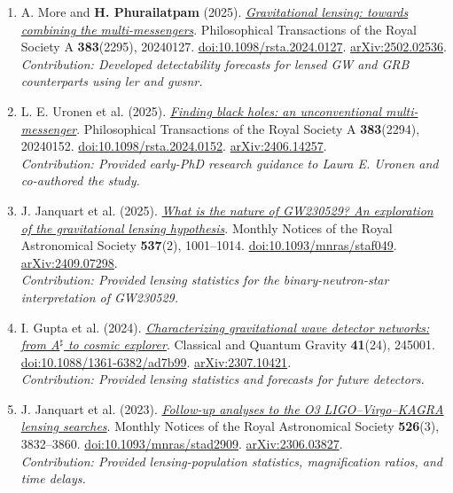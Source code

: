 \documentclass[11pt]{article}
\begin{document}
\begin{enumerate}
\item A. More and \textbf{H. Phurailatpam} (2025). \href{https://doi.org/10.1098/rsta.2024.0127}{\textit{Gravitational lensing: towards combining the multi-messengers}}. Philosophical Transactions of the Royal Society A \textbf{383}(2295), 20240127. \href{https://doi.org/10.1098/rsta.2024.0127}{doi:10.1098/rsta.2024.0127}. \href{https://arxiv.org/abs/2502.02536}{arXiv:2502.02536}.\\\emph{Contribution: Developed detectability forecasts for lensed GW and GRB counterparts using ler and gwsnr.}

\item L. E. Uronen et al. (2025). \href{https://doi.org/10.1098/rsta.2024.0152}{\textit{Finding black holes: an unconventional multi-messenger}}. Philosophical Transactions of the Royal Society A \textbf{383}(2294), 20240152. \href{https://doi.org/10.1098/rsta.2024.0152}{doi:10.1098/rsta.2024.0152}. \href{https://arxiv.org/abs/2406.14257}{arXiv:2406.14257}.\\\emph{Contribution: Provided early-PhD research guidance to Laura E. Uronen and co-authored the study.}

\item J. Janquart et al. (2025). \href{https://doi.org/10.1093/mnras/staf049}{\textit{What is the nature of GW230529? An exploration of the gravitational lensing hypothesis}}. Monthly Notices of the Royal Astronomical Society \textbf{537}(2), 1001--1014. \href{https://doi.org/10.1093/mnras/staf049}{doi:10.1093/mnras/staf049}. \href{https://arxiv.org/abs/2409.07298}{arXiv:2409.07298}.\\\emph{Contribution: Provided lensing statistics for the binary-neutron-star interpretation of GW230529.}

\item I. Gupta et al. (2024). \href{https://doi.org/10.1088/1361-6382/ad7b99}{\textit{Characterizing gravitational wave detector networks: from A$^\sharp$ to cosmic explorer}}. Classical and Quantum Gravity \textbf{41}(24), 245001. \href{https://doi.org/10.1088/1361-6382/ad7b99}{doi:10.1088/1361-6382/ad7b99}. \href{https://arxiv.org/abs/2307.10421}{arXiv:2307.10421}.\\\emph{Contribution: Provided lensing statistics and forecasts for future detectors.}

\newpage
\item J. Janquart et al. (2023). \href{https://doi.org/10.1093/mnras/stad2909}{\textit{Follow-up analyses to the O3 LIGO--Virgo--KAGRA lensing searches}}. Monthly Notices of the Royal Astronomical Society \textbf{526}(3), 3832--3860. \href{https://doi.org/10.1093/mnras/stad2909}{doi:10.1093/mnras/stad2909}. \href{https://arxiv.org/abs/2306.03827}{arXiv:2306.03827}.\\\emph{Contribution: Provided lensing-population statistics, magnification ratios, and time delays.}


\end{enumerate}
\end{document}
